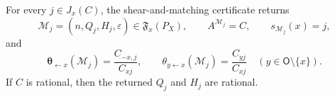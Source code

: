 For every \(j\in J_x(C)\), the shear-and-matching certificate returns
\[
\mathcal M_j=(n,Q_j,H_j,\varepsilon)\in\mathfrak F_x(P_X),
\qquad A^{\mathcal M_j}=C,
\qquad s_{\mathcal M_j}(x)=j,
\]
and
\[
\boldsymbol\theta_{\leftarrow x}(\mathcal M_j)=\frac{C_{-x,j}}{C_{xj}},
\qquad
\theta_{y\leftarrow x}(\mathcal M_j)=\frac{C_{yj}}{C_{xj}}
\quad(y\in\mathsf O\setminus\{x\}).
\]
If \(C\) is rational, then the returned \(Q_j\) and \(H_j\) are rational.
